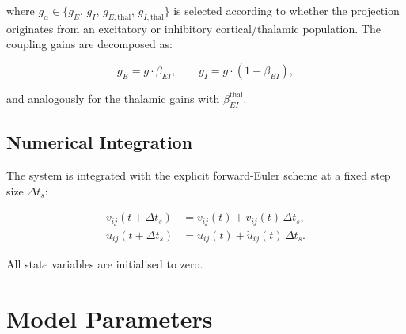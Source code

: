 \documentclass[12pt, a4paper]{article}
\begin{document}
\noindent where $g_\alpha \in \{g_E,\, g_I,\, g_{E,\text{thal}},\, g_{I,\text{thal}}\}$
is selected according to whether the projection originates from an excitatory or
inhibitory cortical/thalamic population.  The coupling gains are decomposed as:

\begin{equation}
    g_E = g \cdot \beta_{EI}, \qquad g_I = g \cdot (1 - \beta_{EI}),
    \label{eq:gains}
\end{equation}

\noindent and analogously for the thalamic gains with $\beta_{EI}^{\text{thal}}$.

\subsection{Numerical Integration}

The system is integrated with the explicit forward-Euler scheme at a fixed step size
$\Delta t_s$:

\begin{align}
    v_{ij}(t+\Delta t_s) &= v_{ij}(t) + \dot{v}_{ij}(t)\,\Delta t_s, \\
    u_{ij}(t+\Delta t_s) &= u_{ij}(t) + \dot{u}_{ij}(t)\,\Delta t_s.
\end{align}

All state variables are initialised to zero.

\section{Model Parameters}
\end{document}
